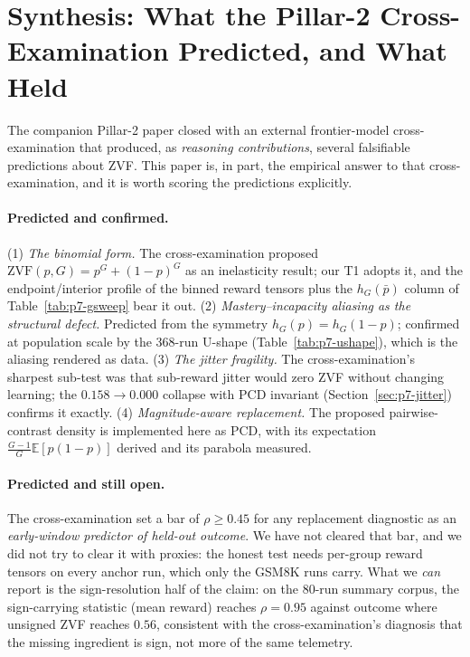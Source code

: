 \documentclass{article}
\newcommand{\E}{\mathbb{E}}
\begin{document}
 \section{Synthesis: What the Pillar-2 Cross-Examination Predicted, and What
Held}
\label{sec:p7-synthesis}
The companion Pillar-2 paper closed with an external frontier-model
cross-examination that produced, as \emph{reasoning contributions},
several falsifiable predictions about ZVF. This paper is, in part, the
empirical answer to that cross-examination, and it is worth scoring the
predictions explicitly.

\paragraph{Predicted and confirmed.} (1) \emph{The binomial form.} The
cross-examination proposed $\mathrm{ZVF}(p, G) = p^G + (1-p)^G$ as an
inelasticity result; our T1 adopts it, and the endpoint/interior profile of
the binned reward tensors plus the $h_G(\bar p)$ column of
Table~\ref{tab:p7-gsweep} bear it out. (2) \emph{Mastery--incapacity
aliasing as the structural defect.} Predicted from the symmetry
$h_G(p) = h_G(1-p)$; confirmed at population scale by the 368-run U-shape
(Table~\ref{tab:p7-ushape}), which is the aliasing rendered as data.
(3) \emph{The jitter fragility.} The cross-examination's sharpest sub-test
was that sub-reward jitter would zero ZVF without changing learning; the
$0.158 \to 0.000$ collapse with PCD invariant
(Section~\ref{sec:p7-jitter}) confirms it exactly. (4) \emph{Magnitude-aware
replacement.} The proposed pairwise-contrast density is implemented here as
PCD, with its expectation $\frac{G-1}{G}\E[p(1-p)]$ derived and its parabola
measured.

\paragraph{Predicted and still open.} The cross-examination set a bar of
$\rho \geq 0.45$ for any replacement diagnostic as an \emph{early-window
predictor of held-out outcome}. We have not cleared that bar, and we did
not try to clear it with proxies: the honest test needs per-group reward
tensors on every anchor run, which only the GSM8K runs carry. What we
\emph{can} report is the sign-resolution half of the claim: on the 80-run
summary corpus, the sign-carrying statistic (mean reward) reaches
$\rho = 0.95$ against outcome where unsigned ZVF reaches $0.56$, consistent
with the cross-examination's diagnosis that the missing ingredient is sign,
not more of the same telemetry.
\end{document}
